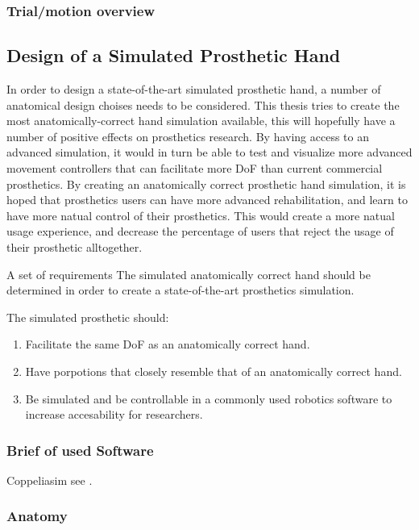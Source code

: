 \documentclass[../main.tex]{subfiles}
\begin{document}
\subsubsection{Trial/motion overview}

\subsection{Design of a Simulated Prosthetic Hand}

In order to design a state-of-the-art simulated prosthetic hand, a number of anatomical design choises needs to be considered.
This thesis tries to create the most anatomically-correct hand simulation available, this will hopefully have a number of positive effects on prosthetics research.
By having access to an advanced simulation, it would in turn be able to test and visualize more advanced movement controllers that can facilitate more DoF than current commercial prosthetics. 
By creating an anatomically correct prosthetic hand simulation, it is hoped that prosthetics users can have more advanced rehabilitation, and learn to have more natual control of their prosthetics. This would create a more natual usage experience, and decrease the percentage of users that reject the usage of their prosthetic alltogether.

A set of requirements The simulated anatomically correct hand should be determined in order to create a state-of-the-art prosthetics simulation.

The simulated prosthetic should:

\begin{enumerate}
\item Facilitate the same DoF as an anatomically correct hand.
\item Have porpotions that closely resemble that of an anatomically correct hand.
\item Be simulated and be controllable in a commonly used robotics software to increase accesability for researchers.
\end{enumerate}


\subsubsection{Brief of used Software}
\label{sec:software}

Coppeliasim see \cite{coppeliasim}.

\subsubsection{Anatomy}
\label{sec:anatomy}
\end{document}
